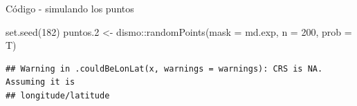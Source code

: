 \documentclass[
  11pt,
  ignorenonframetext,
]{beamer}
\newenvironment{Shaded}{}{}
\newcommand{\AttributeTok}[1]{\textcolor[rgb]{0.49,0.56,0.16}{#1}}
\newcommand{\DecValTok}[1]{\textcolor[rgb]{0.25,0.63,0.44}{#1}}
\newcommand{\FloatTok}[1]{\textcolor[rgb]{0.25,0.63,0.44}{#1}}
\newcommand{\FunctionTok}[1]{\textcolor[rgb]{0.02,0.16,0.49}{#1}}
\newcommand{\NormalTok}[1]{#1}
\newcommand{\OtherTok}[1]{\textcolor[rgb]{0.00,0.44,0.13}{#1}}
\newcommand{\SpecialCharTok}[1]{\textcolor[rgb]{0.25,0.44,0.63}{#1}}
\begin{document}
\begin{frame}[fragile]{Código - simulando los puntos}
\protect\hypertarget{cuxf3digo---simulando-los-puntos}{}
\begin{Shaded}
\begin{Highlighting}[]
\FunctionTok{set.seed}\NormalTok{(}\DecValTok{182}\NormalTok{)}
\NormalTok{puntos}\FloatTok{.2} \OtherTok{\textless{}{-}}\NormalTok{ dismo}\SpecialCharTok{::}\FunctionTok{randomPoints}\NormalTok{(}\AttributeTok{mask =}\NormalTok{ md.exp,}
                                \AttributeTok{n =} \DecValTok{200}\NormalTok{,}
                                \AttributeTok{prob =}\NormalTok{ T)}
\end{Highlighting}
\end{Shaded}

\begin{verbatim}
## Warning in .couldBeLonLat(x, warnings = warnings): CRS is NA. Assuming it is
## longitude/latitude
\end{verbatim}

\begin{Shaded}
\end{Shaded}
\end{frame}
\end{document}

